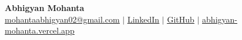 \documentclass[letterpaper,11pt]{article}
\begin{document}
\begin{center}
  \textbf{\Huge Abhigyan Mohanta} \\ \vspace{5pt}
  \small \href{mailto:mohantaabhigyan02@gmail.com}{\underline{mohantaabhigyan02@gmail.com}} $|$
  \href{https://linkedin.com/in/abhigyan-mohanta/}{\underline{LinkedIn}} $|$
  \href{https://github.com/ABHIGYAN-MOHANTA}{\underline{GitHub}} $|$
  \href{https://abhigyan-mohanta.vercel.app/}{\underline{abhigyan-mohanta.vercel.app}}
\end{center}



\end{document}
